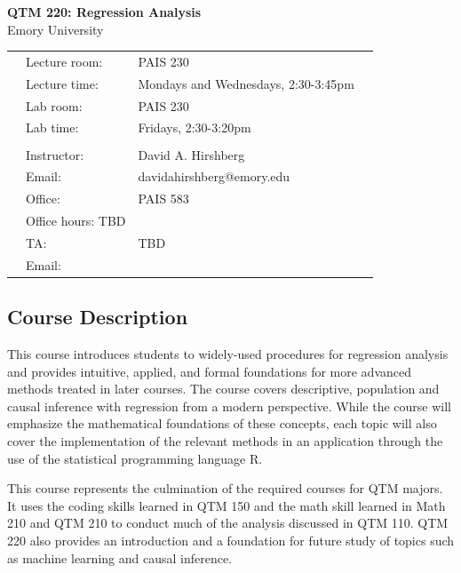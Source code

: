 \documentclass[12pt]{article}
\begin{document}
			
				\begin{center}
				{\large \textbf{QTM 220: Regression Analysis } }\\
				\vspace{0.1in}
				Emory University\\
				\vspace{0.2in}
				\begin{tabular}{llll}
				&	Lecture room:     & PAIS 230  &\\
					& Lecture time:   & Mondays and Wednesdays, 2:30-3:45pm & \\
					& Lab room:       & PAIS 230 & \\
				& 	Lab time: & Fridays, 2:30-3:20pm & \\
					\\
					& Instructor:     & David A. Hirshberg & \\
					&Email: & davidahirshberg@emory.edu &\\
					&Office: & PAIS 583  &\\
					& Office hours: TBD &  \\
					& TA: & TBD &\\
					& Email: & & \\
					
				\end{tabular}
			\end{center}
			
			
\subsection*{Course Description}
This course introduces students to widely-used procedures for regression analysis and provides intuitive, applied, and formal foundations for more advanced methods treated in later courses. The course covers descriptive, population and causal inference with regression from a modern perspective. While the course will emphasize the mathematical foundations of these concepts, each topic will also cover the implementation of the relevant methods in an application through the use of the statistical programming language R.

This course represents the culmination of the required courses for QTM majors. It uses the coding skills learned in QTM 150 and the math skill learned in Math 210 and QTM 210 to conduct much of the analysis discussed in QTM 110. QTM 220 also provides an introduction and a foundation for future study of topics such as machine learning and causal inference. 
\end{document}
